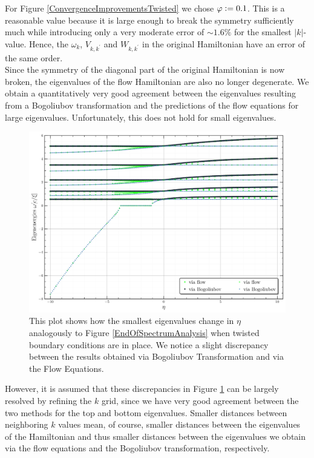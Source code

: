 For Figure \ref{ConvergenceImprovementsTwisted} we chose $\varphi\vcentcolon= 0.1$. This is a reasonable value because it is large enough to break the symmetry sufficiently much while introducing only a very moderate error of $\sim 1.6\%$ for the smallest $|k|$-value. Hence, the $\omega_k$, $V_{k,k^\prime}$ and $W_{k,k^\prime}$ in the original Hamiltonian have an error of the same order.\\
Since the symmetry of the diagonal part of the original Hamiltonian is now broken, the eigenvalues of the flow Hamiltonian are also no longer degenerate. We obtain a quantitatively very good agreement between the eigenvalues resulting from a Bogoliubov transformation and the predictions of the flow equations for large eigenvalues. Unfortunately, this does not hold for small eigenvalues.
\begin{figure}[H]
    \centering
    \includegraphics[width=\textwidth]{figures/plots/PDF/Spectral_analysis,N=40_beginning_of_spectrum.pdf}
    \caption[Beginning of the spectrum of the Hamiltonian with twisted boundary conditions]{This plot shows how the smallest eigenvalues change in $\eta$ analogously to Figure \ref{EndOfSpectrumAnalysis} when twisted boundary conditions are in place. We notice a slight discrepancy between the results obtained via Bogoliubov Transformation and via the Flow Equations.}
    \label{ConvergenceTwistedSmallEigenvalues}
\end{figure}
However, it is assumed that these discrepancies in Figure \ref{ConvergenceTwistedSmallEigenvalues} can be largely resolved by refining the $k$ grid, since we have very good agreement between the two methods for the top and bottom eigenvalues. Smaller distances between neighboring $k$ values mean, of course, smaller distances between the eigenvalues of the Hamiltonian and thus smaller distances between the eigenvalues we obtain via the flow equations and the Bogoliubov transformation, respectively.\\
